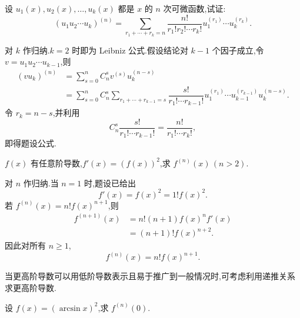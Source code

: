 \begin{example}
    设 $u_1(x),u_2(x),\ldots,u_k(x)$ 都是 $x$ 的 $n$ 次可微函数,试证:
    \[
        (u_1u_2\cdots u_k)^{(n)}
        =\sum\limits_{r_1+\cdots+r_k=n}
        \dfrac{n!}{r_1!r_2!\cdots r_k!}
        u_1^{(r_1)}\cdots u_k^{(r_k)}.
    \]
\end{example}
\exampleblank

\begin{solution}
    对 $k$ 作归纳.$k=2$ 时即为 Leibniz 公式.假设结论对 $k-1$ 个因子成立,令
    $v=u_1u_2\cdots u_{k-1}$,则
    \[
        \begin{aligned}
            (vu_k)^{(n)}
             & =\sum\limits_{s=0}^{n}C_{n}^{s}v^{(s)}u_k^{(n-s)} \\
             & =\sum\limits_{s=0}^{n}C_{n}^{s}
            \sum\limits_{r_1+\cdots+r_{k-1}=s}
            \dfrac{s!}{r_1!\cdots r_{k-1}!}
            u_1^{(r_1)}\cdots u_{k-1}^{(r_{k-1})}u_k^{(n-s)}.
        \end{aligned}
    \]
    令 $r_k=n-s$,并利用
    \[
        C_n^s\dfrac{s!}{r_1!\cdots r_{k-1}!}
        =\dfrac{n!}{r_1!\cdots r_k!},
    \]
    即得题设公式.
\end{solution}

\begin{example}[\markstar]
    $f(x)$ 有任意阶导数,$f'(x)=(f(x))^2$,求 $f^{(n)}(x)\,(n>2)$.
\end{example}
\exampleblank

\begin{solution}
    对 $n$ 作归纳.当 $n=1$ 时,题设已给出
    \[
        f'(x)=f(x)^2=1!f(x)^2.
    \]
    若 $f^{(n)}(x)=n!f(x)^{n+1}$,则
    \[
        \begin{aligned}
            f^{(n+1)}(x)
             & =n!(n+1)f(x)^n f'(x) \\
             & =(n+1)!f(x)^{n+2}.
        \end{aligned}
    \]
    因此对所有 $n\geq1$,
    \[
        f^{(n)}(x)=n!f(x)^{n+1}.
    \]
\end{solution}




当更高阶导数可以用低阶导数表示且易于推广到一般情况时,可考虑利用递推关系求更高阶导数.

\begin{example}
    设 $f(x)=(\arcsin x)^2$,求 $f^{(n)}(0)$.
\end{example}
\exampleblank

